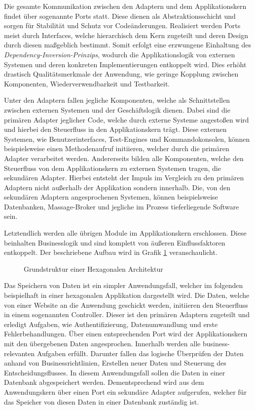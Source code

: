 Die gesamte Kommunikation zwischen den Adaptern und dem Applikationskern findet über sogenannte Ports statt. Diese dienen als Abstraktionsschicht und sorgen für Stabilität und Schutz vor Codeänderungen. Realisiert werden Ports meist durch Interfaces, welche hierarchisch dem Kern zugeteilt und deren Design durch diesen maßgeblich bestimmt. Somit erfolgt eine erzwungene Einhaltung des \emph{Dependency-Inversion-Prinzips}, wodurch die Applikationslogik von externen Systemen und deren konkreten Implementierungen entkoppelt wird. Dies erhöht drastisch Qualitätsmerkmale der Anwendung, wie geringe Kopplung zwischen Komponenten, Wiederverwendbarkeit und Testbarkeit. 

Unter den Adaptern fallen jegliche Komponenten, welche als Schnittstellen zwischen externen Systemen und der Geschäftslogik dienen. Dabei sind die primären Adapter jeglicher Code, welche durch externe Systeme angestoßen wird und hierbei den Steuerfluss in den Applikationskern trägt. Diese externen Systemen, wie Benutzerinterfaces, Test-Engines und Kommandokonsolen, können beispielsweise einen Methodenaufruf initiieren, welcher durch die primären Adapter verarbeitet werden. Andererseits bilden alle Komponenten, welche den Steuerfluss von dem Applikationskern zu externen Systemen tragen, die sekundären Adapter. Hierbei entsteht der Impuls im Vergleich zu den primären Adaptern nicht außerhalb der Applikation sondern innerhalb. Die, von den sekundären Adaptern angesprochenen Systemen, können beispielsweise Datenbanken, Massage-Broker und jegliche im Prozess tieferliegende Software sein. 

Letztendlich werden alle übrigen Module im Applikationskern erschlossen. Diese beinhalten Businesslogik und sind komplett von äußeren Einflussfaktoren entkoppelt. Der beschriebene Aufbau wird in Grafik \ref{fig:HexagonaleArchitektur} veranschaulicht.

\begin{figure}[htbp]
	\centering
	
	\caption{Grundstruktur einer Hexagonalen Architektur}
	\label{fig:HexagonaleArchitektur}
\end{figure}

Das Speichern von Daten ist ein simpler Anwendungsfall, welcher im folgenden beispielhaft in einer hexagonalen Applikation dargestellt wird. Die Daten, welche von einer Website an die Anwendung geschickt werden, initiieren den Steuerfluss in einem sogenannten Controller. Dieser ist den primären Adaptern zugeteilt und erledigt Aufgaben, wie Authentifizierung, Datenumwandlung und erste Fehlerbehandlungen. Über einen entsprechenden Port wird der Applikationskern mit den übergebenen Daten angesprochen. Innerhalb werden alle business-relevanten Aufgaben erfüllt. Darunter fallen das logische Überprüfen der Daten anhand von Businessrichtlinien, Erstellen neuer Daten und Steuerung des Entscheidungsflusses. In diesem Anwendungsfall sollen die Daten in einer Datenbank abgespeichert werden. Dementsprechend wird aus dem Anwendungskern über einen Port ein sekundäre Adapter aufgerufen, welcher für das Speicher von diesen Daten in einer Datenbank zuständig ist.

